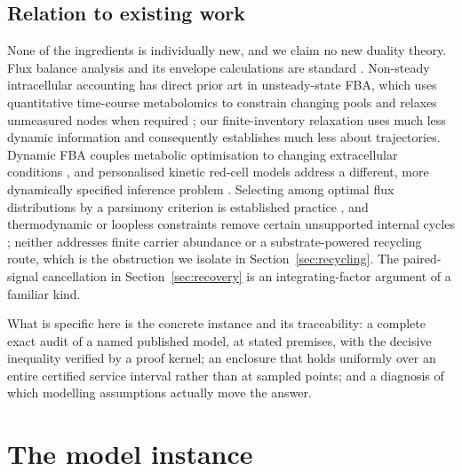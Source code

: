 \documentclass[11pt,a4paper]{article}
\theoremstyle{plain}
\theoremstyle{definition}
\theoremstyle{remark}
\begin{document}
\subsection{Relation to existing work}
None of the ingredients is individually new, and we claim no new duality
theory. Flux balance analysis and its envelope calculations are standard
\citep{orth2010}. Non-steady intracellular accounting has direct prior art in
unsteady-state FBA, which uses quantitative time-course metabolomics to
constrain changing pools and relaxes unmeasured nodes when required
\citep{bordbar2017}; our finite-inventory relaxation uses much less dynamic
information and consequently establishes much less about trajectories. Dynamic
FBA couples metabolic optimisation to changing extracellular conditions
\citep{mahadevan2002}, and personalised kinetic red-cell models address a
different, more dynamically specified inference problem
\citep{bordbar2015}. Selecting among optimal flux distributions by a parsimony
criterion is established practice \citep{lewis2010}, and thermodynamic or
loopless constraints remove certain unsupported internal cycles
\citep{schellenberger2011}; neither addresses finite carrier abundance or a
substrate-powered recycling route, which is the obstruction we isolate in
Section~\ref{sec:recycling}. The paired-signal cancellation in
Section~\ref{sec:recovery} is an integrating-factor argument of a familiar
kind.

What is specific here is the concrete instance and its traceability: a complete
exact audit of a named published model, at stated premises, with the decisive
inequality verified by a proof kernel; an enclosure that holds uniformly over
an entire certified service interval rather than at sampled points; and a
diagnosis of which modelling assumptions actually move the answer.

\section{The model instance}\label{sec:model}
\end{document}

